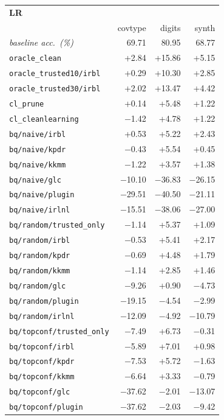 \begin{tabular}{lrrr}
\toprule
\multicolumn{4}{l}{\textbf{LR}} \\
 & covtype & digits & synth \\
\midrule
\textit{baseline acc.\ (\%)} & 69.71 & 80.95 & 68.77 \\
\addlinespace
\texttt{oracle\_clean} & +2.84 & +15.86 & +5.15 \\
\texttt{oracle\_trusted10/irbl} & +0.29 & +10.30 & +2.85 \\
\texttt{oracle\_trusted30/irbl} & +2.02 & +13.47 & +4.42 \\
\texttt{cl\_prune} & +0.14 & +5.48 & +1.22 \\
\texttt{cl\_cleanlearning} & $-$1.42 & +4.78 & +1.22 \\
\texttt{bq/naive/irbl} & +0.53 & +5.22 & +2.43 \\
\texttt{bq/naive/kpdr} & $-$0.43 & +5.54 & +0.45 \\
\texttt{bq/naive/kkmm} & $-$1.22 & +3.57 & +1.38 \\
\texttt{bq/naive/glc} & $-$10.10 & $-$36.83 & $-$26.15 \\
\texttt{bq/naive/plugin} & $-$29.51 & $-$40.50 & $-$21.11 \\
\texttt{bq/naive/irlnl} & $-$15.51 & $-$38.06 & $-$27.00 \\
\texttt{bq/random/trusted\_only} & $-$1.14 & +5.37 & +1.09 \\
\texttt{bq/random/irbl} & $-$0.53 & +5.41 & +2.17 \\
\texttt{bq/random/kpdr} & $-$0.69 & +4.48 & +1.79 \\
\texttt{bq/random/kkmm} & $-$1.14 & +2.85 & +1.46 \\
\texttt{bq/random/glc} & $-$9.26 & +0.90 & $-$4.73 \\
\texttt{bq/random/plugin} & $-$19.15 & $-$4.54 & $-$2.99 \\
\texttt{bq/random/irlnl} & $-$12.09 & $-$4.92 & $-$10.79 \\
\texttt{bq/topconf/trusted\_only} & $-$7.49 & +6.73 & $-$0.31 \\
\texttt{bq/topconf/irbl} & $-$5.89 & +7.01 & +0.98 \\
\texttt{bq/topconf/kpdr} & $-$7.53 & +5.72 & $-$1.63 \\
\texttt{bq/topconf/kkmm} & $-$6.64 & +3.33 & $-$0.79 \\
\texttt{bq/topconf/glc} & $-$37.62 & $-$2.01 & $-$13.07 \\
\texttt{bq/topconf/plugin} & $-$37.62 & $-$2.03 & $-$9.42 \\

\end{tabular}
